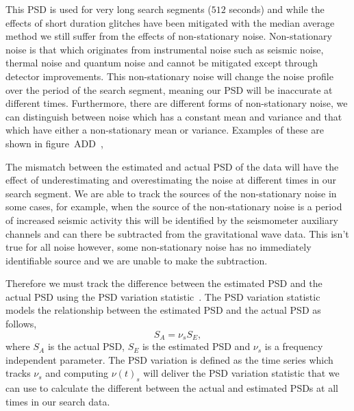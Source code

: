 This PSD is used for very long search segments ($512$ seconds) and while the effects of short duration glitches have been mitigated with the median average method we still suffer from the effects of non-stationary noise. Non-stationary noise is that which originates from instrumental noise such as seismic noise, thermal noise and quantum noise and cannot be mitigated except through detector improvements. This non-stationary noise will change the noise profile over the period of the search segment, meaning our PSD will be inaccurate at different times. Furthermore, there are different forms of non-stationary noise, we can distinguish between noise which has a constant mean and variance and that which have either a non-stationary mean or variance. Examples of these are shown in figure~ADD~\cite{Mozzon_Thesis:2023},
%
%

The mismatch between the estimated and actual PSD of the data will have the effect of underestimating and overestimating the noise at different times in our search segment. We are able to track the sources of the non-stationary noise in some cases, for example, when the source of the non-stationary noise is a period of increased seismic activity this will be identified by the seismometer auxiliary channels and can there be subtracted from the gravitational wave data. This isn't true for all noise however, some non-stationary noise has no immediately identifiable source and we are unable to make the subtraction.

Therefore we must track the difference between the estimated PSD and the actual PSD using the PSD variation statistic~\cite{PSD_var:2020}. The PSD variation statistic models the relationship between the estimated PSD and the actual PSD as follows,
%
\begin{equation}
    S_{A} = \nu_{s} S_{E}, 
\end{equation}
%
where $S_{A}$ is the actual PSD, $S_{E}$ is the estimated PSD and $\nu_{s}$ is a frequency independent parameter. The PSD variation is defined as the time series which tracks $\nu_{s}$ and computing $\nu(t)_{s}$ will deliver the PSD variation statistic that we can use to calculate the different between the actual and estimated PSDs at all times in our search data.

